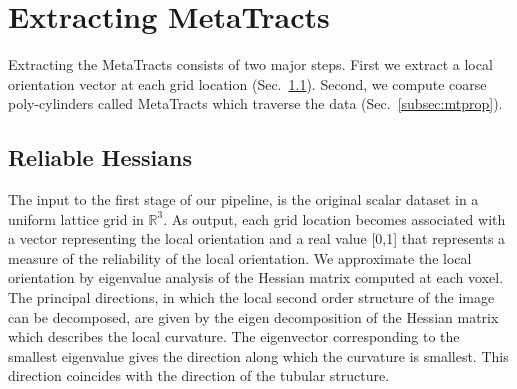 


\section {Extracting MetaTracts }
\label{sec:approach}
Extracting the MetaTracts consists of two  major steps. First we extract a local orientation vector at each grid location (Sec.~\ref{subsec:rh}). Second, we compute coarse poly-cylinders called MetaTracts which traverse the data (Sec.~\ref{subsec:mtprop}).



\subsection {Reliable Hessians}
\label{subsec:rh}

The input to the first stage of our pipeline, is the original scalar dataset in a uniform lattice grid in $\mathbb{R}^3$. As output, each grid location becomes associated with a vector representing the local orientation and a real value [0,1] that represents a measure of the reliability of the local orientation. We approximate the local orientation by eigenvalue analysis of the Hessian matrix computed at each voxel. The principal directions, in which the local second order structure of the image can be decomposed, are given by the eigen decomposition of the Hessian matrix which describes the local curvature.
The eigenvector corresponding to the smallest eigenvalue gives the direction along which the curvature is smallest. This direction coincides with the direction of the tubular structure.

